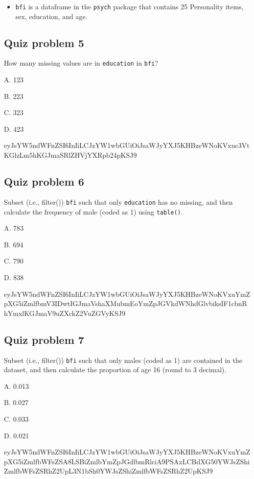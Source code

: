 \documentclass[]{book}
\providecommand{\tightlist}{%
  \setlength{\itemsep}{0pt}\setlength{\parskip}{0pt}}
\begin{document}
\begin{itemize}
\tightlist
\item
  \texttt{bfi} is a dataframe in the \texttt{psych} package that contains 25 Personality items, sex, education, and age.
\end{itemize}

\hypertarget{quiz-problem-5-1}{%
\subsection{Quiz problem 5}\label{quiz-problem-5-1}}

How many missing values are in \texttt{education} in \texttt{bfi}?

A. 123

B. 223

C. 323

D. 423

eyJsYW5ndWFnZSI6InIiLCJzYW1wbGUiOiJsaWJyYXJ5KHBzeWNoKVxuc3VtKGlzLm5hKGJmaSRlZHVjYXRpb24pKSJ9

\hypertarget{quiz-problem-6-1}{%
\subsection{Quiz problem 6}\label{quiz-problem-6-1}}

Subset (i.e., filter()) \texttt{bfi} such that only \texttt{education} has no missing, and then calculate the frequency of male (coded as 1) using \texttt{table()}.

A. 783

B. 694

C. 790

D. 838

eyJsYW5ndWFnZSI6InIiLCJzYW1wbGUiOiJsaWJyYXJ5KHBzeWNoKVxuYmZpXG5iZmlfbmV3IDwtIGJmaVshaXMubmEoYmZpJGVkdWNhdGlvbiksIF1cbnRhYmxlKGJmaV9uZXckZ2VuZGVyKSJ9

\hypertarget{quiz-problem-7-1}{%
\subsection{Quiz problem 7}\label{quiz-problem-7-1}}

Subset (i.e., filter()) \texttt{bfi} such that only males (coded as 1) are contained in the dataset, and then calculate the proportion of age 16 (round to 3 decimal).

A. 0.013

B. 0.027

C. 0.033

D. 0.021

eyJsYW5ndWFnZSI6InIiLCJzYW1wbGUiOiJsaWJyYXJ5KHBzeWNoKVxuYmZpXG5iZmlfbWFsZSA8LSBiZmlbYmZpJGdlbmRlciA9PSAxLCBdXG50YWJsZShiZmlfbWFsZSRhZ2UpL3N1bSh0YWJsZShiZmlfbWFsZSRhZ2UpKSJ9


\end{document}
